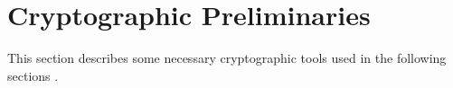 \section{Cryptographic Preliminaries}
This section describes some necessary cryptographic tools used in the following sections \cite{ZPG}.
% 
% 
% 






